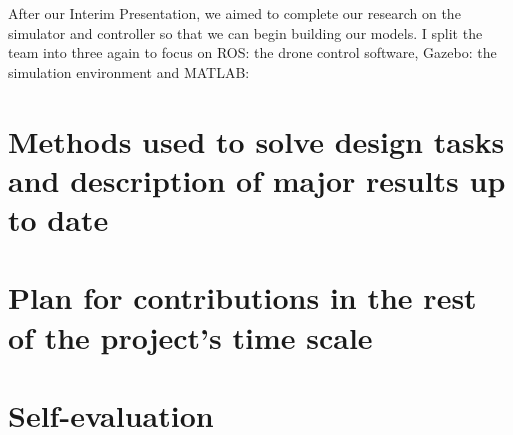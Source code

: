 \documentclass[10pt]{article}
\begin{document}
After our Interim Presentation, we aimed to complete our research on the simulator and controller so that we can begin building our models. I split the team into three again to focus on ROS: the drone control software, Gazebo: the simulation environment and MATLAB: 

\section{Methods used to solve design tasks and description of major results up to date}\label{methods}
\section{Plan for contributions in the rest of the project's time scale}
\section{Self-evaluation}
\end{document}
